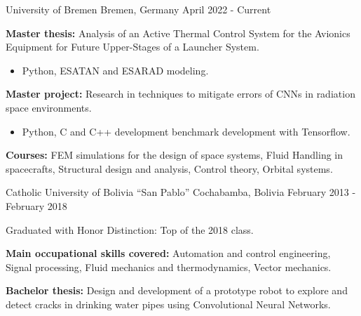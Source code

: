 

\begin{cventries}
  {University of Bremen}
  {Bremen, Germany}
  {April 2022 - Current}
  {
    \begin{cvitems}
      \item \textbf{Master thesis:} Analysis of an Active Thermal
      Control System for the Avionics Equipment for Future
      Upper-Stages of a Launcher System.
      \begin{itemize}
        \item[\bullet] Python, ESATAN and ESARAD modeling. 
      \end{itemize}
      \item \textbf{Master project:} Research in techniques to
      mitigate errors of CNNs in radiation space environments.
      \begin{itemize}
        \item[\bullet] Python, C and C++ development benchmark
        development with Tensorflow. 
      \end{itemize}
      \item \textbf{Courses:} FEM simulations for the design of space
      systems, Fluid Handling in spacecrafts, Structural design and
      analysis, Control theory, Orbital systems.
    \end{cvitems}
  }

  {Catholic University of Bolivia ``San Pablo''}
  {Cochabamba, Bolivia}
  {February 2013 - February 2018}
  {
    \begin{cvitems}
      \item Graduated with Honor Distinction: Top of the 2018 class.
      \item \textbf{Main occupational skills covered:} Automation and
      control engineering, Signal processing, Fluid mechanics and
      thermodynamics, Vector mechanics.
      \item \textbf{Bachelor thesis:} Design and development of a
      prototype robot to explore and detect cracks in drinking water
      pipes using Convolutional Neural Networks.
    \end{cvitems}
  }


\end{cventries}
